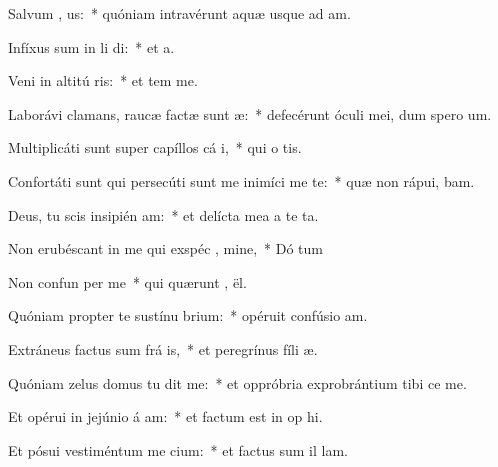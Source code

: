 \item Salvum  , us:~* quóniam intravérunt aquæ usque ad  am.
\item Infíxus sum in li di:~* et   a.
\item Veni in altitú ris:~* et tem  me.
\item Laborávi clamans, raucæ factæ sunt  æ:~* defecérunt óculi mei, dum spero   um.
\item Multiplicáti sunt super capíllos cá i,~* qui o  tis.
\item Confortáti sunt qui persecúti sunt me inimíci me te:~* quæ non rápui,  bam.
\item Deus, tu scis insipién am:~* et delícta mea a te   ta.
\item Non erubéscant in me qui exspéc , mine,~* Dó tum
\item Non confun per me~* qui quærunt ,  ël.
\item Quóniam propter te sustínu brium:~* opéruit confúsio  am.
\item Extráneus factus sum frá is,~* et peregrínus fíli  æ.
\item Quóniam zelus domus tu dit me:~* et oppróbria exprobrántium tibi ce  me.
\item Et opérui in jejúnio á am:~* et factum est in op hi.
\item Et pósui vestiméntum me cium:~* et factus sum il  lam.
